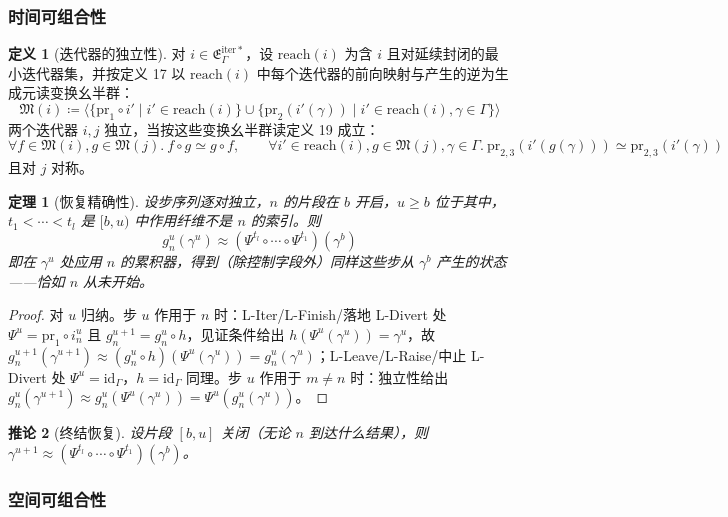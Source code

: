 \documentclass[11pt,a4paper]{article}
\theoremstyle{plain}
\newtheorem{theorem}{定理}
\newtheorem{corollary}[theorem]{推论}
\theoremstyle{definition}
\newtheorem{definition}{定义}
\theoremstyle{remark}
\begin{document}
\subsubsection{时间可组合性}

\begin{definition}[迭代器的独立性]
对 $i \in \mathfrak{E}_\Gamma^{\mathrm{iter}\ast}$，设 $\mathrm{reach}(i)$ 为含 $i$ 且对延续封闭的最小迭代器集，并按定义 17 以 $\mathrm{reach}(i)$ 中每个迭代器的前向映射与产生的逆为生成元读变换幺半群：
\[
\mathfrak{M}(i) \coloneqq \big\langle \{\mathrm{pr}_1 \circ i' \mid i' \in \mathrm{reach}(i)\} \cup \{\mathrm{pr}_2(i'(\gamma)) \mid i' \in \mathrm{reach}(i), \gamma \in \Gamma\} \big\rangle \tag{54}
\]
两个迭代器 $i, j$ 独立，当按这些变换幺半群读定义 19 成立：
\[
\forall f \in \mathfrak{M}(i), g \in \mathfrak{M}(j).\ f \circ g \simeq g \circ f, \qquad
\forall i' \in \mathrm{reach}(i), g \in \mathfrak{M}(j), \gamma \in \Gamma.\ \mathrm{pr}_{2,3}(i'(g(\gamma))) \simeq \mathrm{pr}_{2,3}(i'(\gamma)) \tag{55}
\]
且对 $j$ 对称。
\end{definition}

\begin{theorem}[恢复精确性]
设步序列逐对独立，$n$ 的片段在 $b$ 开启，$u \ge b$ 位于其中，$t_1 < \cdots < t_l$ 是 $[b, u)$ 中作用纤维不是 $n$ 的索引。则
\[
g_n^u(\gamma^u) \approx (\Psi^{t_l} \circ \cdots \circ \Psi^{t_1})(\gamma^b) \tag{56}
\]
即在 $\gamma^u$ 处应用 $n$ 的累积器，得到（除控制字段外）同样这些步从 $\gamma^b$ 产生的状态——恰如 $n$ 从未开始。
\end{theorem}

\begin{proof}
对 $u$ 归纳。步 $u$ 作用于 $n$ 时：L-Iter/L-Finish/落地 L-Divert 处 $\Psi^u = \mathrm{pr}_1 \circ i_n^u$ 且 $g_n^{u+1} = g_n^u \circ h$，见证条件给出 $h(\Psi^u(\gamma^u)) = \gamma^u$，故 $g_n^{u+1}(\gamma^{u+1}) \approx (g_n^u \circ h)(\Psi^u(\gamma^u)) = g_n^u(\gamma^u)$；L-Leave/L-Raise/中止 L-Divert 处 $\Psi^u = \mathrm{id}_\Gamma$，$h = \mathrm{id}_\Gamma$ 同理。步 $u$ 作用于 $m \neq n$ 时：独立性给出 $g_n^u(\gamma^{u+1}) \approx g_n^u(\Psi^u(\gamma^u)) = \Psi^u(g_n^u(\gamma^u))$。
\end{proof}

\begin{corollary}[终结恢复]
设片段 $[b, u]$ 关闭（无论 $n$ 到达什么结果），则 $\gamma^{u+1} \approx (\Psi^{t_l} \circ \cdots \circ \Psi^{t_1})(\gamma^b)$。
\end{corollary}

\subsubsection{空间可组合性}
\end{document}
